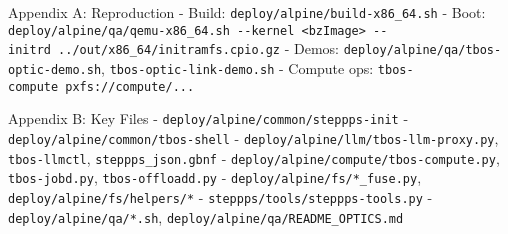 \documentclass[]{article}
\begin{document}
Appendix A: Reproduction - Build:
\texttt{deploy/alpine/build-x86\_64.sh} - Boot:
\texttt{deploy/alpine/qa/qemu-x86\_64.sh\ -\/-kernel\ \textless{}bzImage\textgreater{}\ -\/-initrd\ ../out/x86\_64/initramfs.cpio.gz}
- Demos: \texttt{deploy/alpine/qa/tbos-optic-demo.sh},
\texttt{tbos-optic-link-demo.sh} - Compute ops:
\texttt{tbos-compute\ pxfs://compute/...}

Appendix B: Key Files - \texttt{deploy/alpine/common/steppps-init} -
\texttt{deploy/alpine/common/tbos-shell} -
\texttt{deploy/alpine/llm/tbos-llm-proxy.py}, \texttt{tbos-llmctl},
\texttt{steppps\_json.gbnf} -
\texttt{deploy/alpine/compute/tbos-compute.py}, \texttt{tbos-jobd.py},
\texttt{tbos-offloadd.py} - \texttt{deploy/alpine/fs/*\_fuse.py},
\texttt{deploy/alpine/fs/helpers/*} -
\texttt{steppps/tools/steppps-tools.py} -
\texttt{deploy/alpine/qa/*.sh},
\texttt{deploy/alpine/qa/README\_OPTICS.md}
\end{document}
